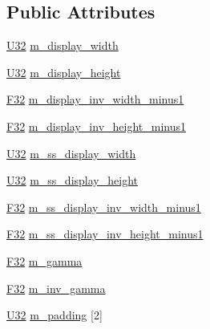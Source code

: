 \subsection*{Public Attributes}
\begin{DoxyCompactItemize}
\item 
\hyperlink{namespacemage_a41c104c036fba3756a74e19f793eeaa1}{U32} \hyperlink{structmage_1_1_game_buffer_abc3b318a7c0d608bd1d72124032d7af8}{m\+\_\+display\+\_\+width}
\item 
\hyperlink{namespacemage_a41c104c036fba3756a74e19f793eeaa1}{U32} \hyperlink{structmage_1_1_game_buffer_ad4543663789eebde08b8775759e40dec}{m\+\_\+display\+\_\+height}
\item 
\hyperlink{namespacemage_aa97e833b45f06d60a0a9c4fc22ae02c0}{F32} \hyperlink{structmage_1_1_game_buffer_a7db70b391fbf5ba58018d4f77ff06bba}{m\+\_\+display\+\_\+inv\+\_\+width\+\_\+minus1}
\item 
\hyperlink{namespacemage_aa97e833b45f06d60a0a9c4fc22ae02c0}{F32} \hyperlink{structmage_1_1_game_buffer_a1958156c6deefba5161e7aab7204a5ea}{m\+\_\+display\+\_\+inv\+\_\+height\+\_\+minus1}
\item 
\hyperlink{namespacemage_a41c104c036fba3756a74e19f793eeaa1}{U32} \hyperlink{structmage_1_1_game_buffer_a5571b4b908c0e25083d3b8949d1c7706}{m\+\_\+ss\+\_\+display\+\_\+width}
\item 
\hyperlink{namespacemage_a41c104c036fba3756a74e19f793eeaa1}{U32} \hyperlink{structmage_1_1_game_buffer_a95b2766f3320627910ec153b512e5695}{m\+\_\+ss\+\_\+display\+\_\+height}
\item 
\hyperlink{namespacemage_aa97e833b45f06d60a0a9c4fc22ae02c0}{F32} \hyperlink{structmage_1_1_game_buffer_ad2d605152c5c5a3e0059e65fd6814238}{m\+\_\+ss\+\_\+display\+\_\+inv\+\_\+width\+\_\+minus1}
\item 
\hyperlink{namespacemage_aa97e833b45f06d60a0a9c4fc22ae02c0}{F32} \hyperlink{structmage_1_1_game_buffer_a28079651a44977c137e07c88de9caabc}{m\+\_\+ss\+\_\+display\+\_\+inv\+\_\+height\+\_\+minus1}
\item 
\hyperlink{namespacemage_aa97e833b45f06d60a0a9c4fc22ae02c0}{F32} \hyperlink{structmage_1_1_game_buffer_a7c7abe0dbee37447b27c9e7f7c95d479}{m\+\_\+gamma}
\item 
\hyperlink{namespacemage_aa97e833b45f06d60a0a9c4fc22ae02c0}{F32} \hyperlink{structmage_1_1_game_buffer_a52ddb29e16782a4dcc4e6818b3983c20}{m\+\_\+inv\+\_\+gamma}
\item 
\hyperlink{namespacemage_a41c104c036fba3756a74e19f793eeaa1}{U32} \hyperlink{structmage_1_1_game_buffer_a6ab9b395e6cf4a6e120bb7ddf4be6913}{m\+\_\+padding} \mbox{[}2\mbox{]}
\end{DoxyCompactItemize}


